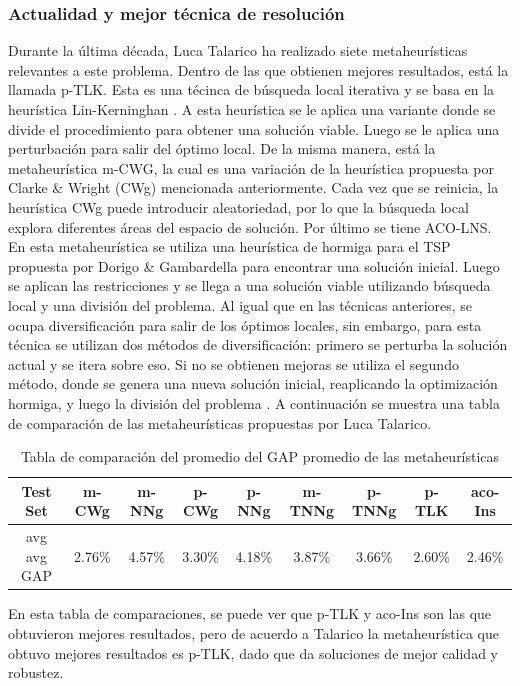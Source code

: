 \documentclass{article}
\begin{document}
\subsubsection{Actualidad y mejor técnica de resolución}
Durante la última década, Luca Talarico ha realizado siete metaheurísticas relevantes a este problema. Dentro de las que obtienen mejores resultados, está la llamada p-TLK. Esta es una técinca de búsqueda local iterativa \cite{lourencco2019iterated} y se basa en la heurística Lin-Kerninghan \cite{helsgaun2000effective}. A esta heurística se le aplica una variante donde se divide el procedimiento para obtener una solución viable. Luego se le aplica una perturbación para salir del óptimo local. De la misma manera, está la metaheurística m-CWG, la cual es una variación de la heurística propuesta por Clarke \& Wright (CWg) mencionada anteriormente. Cada vez que se reinicia, la heurística CWg puede introducir aleatoriedad, por lo que la búsqueda local explora diferentes áreas del espacio de solución. Por último se tiene ACO-LNS. En esta metaheurística se utiliza una heurística de hormiga para el TSP propuesta por Dorigo \& Gambardella para encontrar una solución inicial. Luego se aplican las restricciones y se llega a una solución viable utilizando búsqueda local y una división del problema. Al igual que en las técnicas anteriores, se ocupa diversificación para salir de los óptimos locales, sin embargo, para esta técnica se utilizan dos métodos de diversificación: primero se perturba la solución actual y se itera sobre eso. Si no se obtienen mejoras se utiliza el segundo método, donde se genera una nueva solución inicial, reaplicando la optimización hormiga, y luego la división del problema \cite{talarico2017large}. A continuación se muestra una tabla de comparación de las metaheurísticas propuestas por Luca Talarico. 


\begin{table}[H]
    \begin{tabular}{|c|c|c|c|c|c|c|c|c|}
    \hline
    Test Set    & m-CWg  & m-NNg  & p-CWg  & p-NNg  & m-TNNg & p-TNNg & p-TLK  & aco-Ins \\ \hline
    avg avg GAP & 2.76\% & 4.57\% & 3.30\% & 4.18\% & 3.87\% & 3.66\% & 2.60\% & 2.46\%  \\ \hline
    \end{tabular}
    \caption{Tabla de comparación del promedio del GAP promedio de las metaheurísticas \cite{talarico2017large}}
    \label{fig:metaheuristic-comparison}
\end{table}
En esta tabla de comparaciones, se puede ver que p-TLK y aco-Ins son las que obtuvieron mejores resultados, pero de acuerdo a Talarico \cite{talarico2015metaheuristics} la metaheurística que obtuvo mejores resultados es p-TLK, dado que da soluciones de mejor calidad y robustez.
\end{document}
